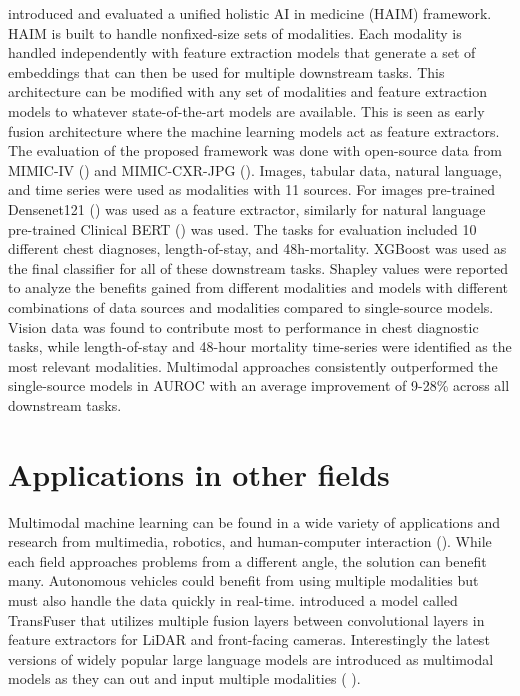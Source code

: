 \cite{articlehaim} introduced and evaluated a unified holistic AI in medicine (HAIM) framework. HAIM is built to handle nonfixed-size sets of modalities. Each modality is handled independently with feature extraction models that generate a set of embeddings that can then be used for multiple downstream tasks. This architecture can be modified with any set of modalities and feature extraction models to whatever state-of-the-art models are available. This is seen as early fusion architecture where the machine learning models act as feature extractors. The evaluation of the proposed framework was done with open-source data from MIMIC-IV (\cite{articlemimic4}) and MIMIC-CXR-JPG (\cite{mimicXR}). Images, tabular data, natural language, and time series were used as modalities with 11 sources. For images pre-trained Densenet121 (\cite{densenet}) was used as a feature extractor, similarly for natural language pre-trained Clinical BERT (\cite{bertclinic}) was used. The tasks for evaluation included 10 different chest diagnoses, length-of-stay, and 48h-mortality. XGBoost was used as the final classifier for all of these downstream tasks. Shapley values were reported to analyze the benefits gained from different modalities and models with different combinations of data sources and modalities compared to single-source models. Vision data was found to contribute most to performance in chest diagnostic tasks, while length-of-stay and 48-hour mortality time-series were identified as the most relevant modalities. Multimodal approaches consistently outperformed the single-source models in AUROC with an average improvement of 9-28\% across all downstream tasks. 


\section{Applications in other fields}

Multimodal machine learning can be found in a wide variety of applications and research from multimedia, robotics, and human-computer interaction (\cite{liang2023foundations}). While each field approaches problems from a different angle, the solution can benefit many. Autonomous vehicles could benefit from using multiple modalities but must also handle the data quickly in real-time. \cite{prakash2021multi} introduced a model called TransFuser that utilizes multiple fusion layers between convolutional layers in feature extractors for LiDAR and front-facing cameras. Interestingly the latest versions of widely popular large language models are introduced as multimodal models as they can out and input multiple modalities (\cite{openai2024gpt4} \cite{geminiteam2023gemini}). 

